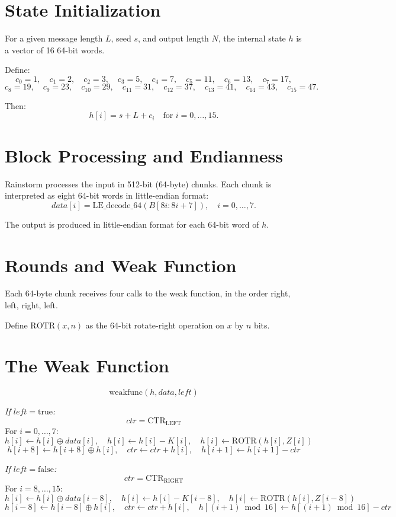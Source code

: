 \documentclass[11pt,a4paper]{article}
\begin{document}
\section*{State Initialization}
For a given message length $L$, seed $s$, and output length $N$, the internal state $h$ is a vector of 16 64-bit words.

Define:
\[
c_0 = 1,\quad
c_1 = 2,\quad
c_2 = 3,\quad
c_3 = 5,\quad
c_4 = 7,\quad
c_5 = 11,\quad
c_6 = 13,\quad
c_7 = 17,
\]
\[
c_8 = 19,\quad
c_9 = 23,\quad
c_{10} = 29,\quad
c_{11} = 31,\quad
c_{12} = 37,\quad
c_{13} = 41,\quad
c_{14} = 43,\quad
c_{15} = 47.
\]

Then:
\[
h[i] = s + L + c_i \quad \text{for } i=0,\ldots,15.
\]

\section*{Block Processing and Endianness}
Rainstorm processes the input in 512-bit (64-byte) chunks. Each chunk is interpreted as eight 64-bit words in little-endian format:
\[
data[i] = \text{LE\_decode\_64}(B[8i : 8i+7]), \quad i=0,\ldots,7.
\]

The output is produced in little-endian format for each 64-bit word of $h$.

\section*{Rounds and Weak Function}
Each 64-byte chunk receives four calls to the weak function, in the order right, left, right, left.

Define $\text{ROTR}(x,n)$ as the 64-bit rotate-right operation on $x$ by $n$ bits.

\section*{The Weak Function}
\[
\text{weakfunc}(h, data, left)
\]

\textit{If $left = \text{true}$:}
\[
ctr = \text{CTR}_{\text{LEFT}}
\]
For $i=0,\ldots,7$:
\[
h[i] \leftarrow h[i] \oplus data[i], \quad
h[i] \leftarrow h[i] - K[i], \quad
h[i] \leftarrow \text{ROTR}(h[i], Z[i])
\]
\[
h[i+8] \leftarrow h[i+8] \oplus h[i], \quad
ctr \leftarrow ctr + h[i], \quad
h[i+1] \leftarrow h[i+1] - ctr
\]

\textit{If $left = \text{false}$:}
\[
ctr = \text{CTR}_{\text{RIGHT}}
\]
For $i=8,\ldots,15$:
\[
h[i] \leftarrow h[i] \oplus data[i-8], \quad
h[i] \leftarrow h[i] - K[i-8], \quad
h[i] \leftarrow \text{ROTR}(h[i], Z[i-8])
\]
\[
h[i-8] \leftarrow h[i-8] \oplus h[i], \quad
ctr \leftarrow ctr + h[i], \quad
h[(i+1)\bmod 16] \leftarrow h[(i+1)\bmod 16] - ctr
\]
\end{document}
